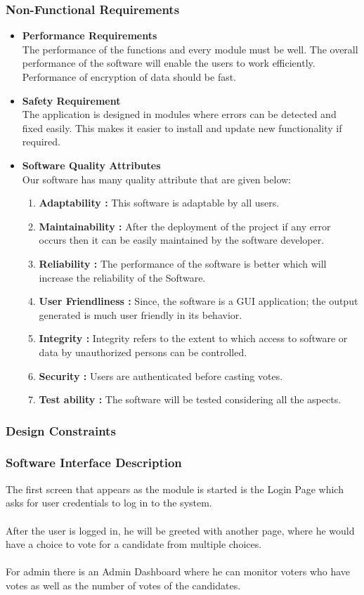 \documentclass[oneside, 12pt]{book}
\begin{document}
			\subsubsection{Non-Functional Requirements}
				\begin{itemize}
					\item\textbf{Performance Requirements}\\The performance of the functions and every module must be well. The overall performance of the software will enable the users to work efficiently. Performance of encryption of data should be fast.
					\item\textbf{Safety Requirement}\\The application is designed in modules where errors can be detected and fixed easily. This makes it easier to install and update new functionality if required.
					\item\textbf{Software Quality Attributes}\\Our software has many quality attribute that are given below:
						\begin{enumerate}
							\item\textbf{Adaptability :} This software is adaptable by all users.
							\item\textbf{Maintainability :} After the deployment of the project if any error occurs then it can be easily maintained by the software developer.
							\item\textbf{Reliability :} The performance of the software is better which will increase the reliability of the Software.
							\item\textbf{User Friendliness :} Since, the software is a GUI application; the output generated is much user friendly in its behavior.
							\item\textbf{Integrity :} Integrity refers to the extent to which access to software or data by unauthorized persons can be controlled.
							\item\textbf{Security :} Users are authenticated before casting votes.
							\item\textbf{Test ability :} The software will be tested considering all the aspects.
						\end{enumerate}
				\end{itemize}
			\subsubsection{Design Constraints}
			\subsubsection{Software Interface Description}
				The first screen that appears as the module is started is the Login Page which asks for user credentials to log in to the system. 
				\\\\After the user is logged in, he will be greeted with another page, where he would have a choice to vote for a candidate from multiple choices.
				\\\\For admin there is an Admin Dashboard where he can monitor voters who have votes as well as the number of votes of the candidates.
	\newpage	
\end{document}
